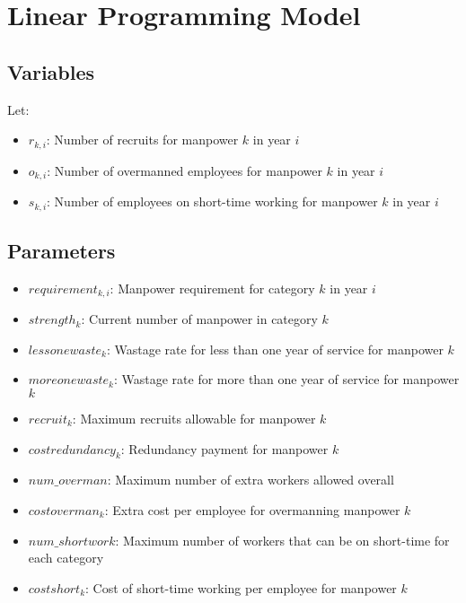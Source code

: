 \documentclass{article}
\begin{document}
\section*{Linear Programming Model}

\subsection*{Variables}
Let:
\begin{itemize}
    \item \( r_{k,i} \): Number of recruits for manpower \( k \) in year \( i \)
    \item \( o_{k,i} \): Number of overmanned employees for manpower \( k \) in year \( i \)
    \item \( s_{k,i} \): Number of employees on short-time working for manpower \( k \) in year \( i \)
\end{itemize}

\subsection*{Parameters}
\begin{itemize}
    \item \( requirement_{k,i} \): Manpower requirement for category \( k \) in year \( i \)
    \item \( strength_{k} \): Current number of manpower in category \( k \)
    \item \( lessonewaste_{k} \): Wastage rate for less than one year of service for manpower \( k \)
    \item \( moreonewaste_{k} \): Wastage rate for more than one year of service for manpower \( k \)
    \item \( recruit_{k} \): Maximum recruits allowable for manpower \( k \)
    \item \( costredundancy_{k} \): Redundancy payment for manpower \( k \)
    \item \( num\_overman \): Maximum number of extra workers allowed overall
    \item \( costoverman_{k} \): Extra cost per employee for overmanning manpower \( k \)
    \item \( num\_shortwork \): Maximum number of workers that can be on short-time for each category
    \item \( costshort_{k} \): Cost of short-time working per employee for manpower \( k \)
\end{itemize}
\end{document}
